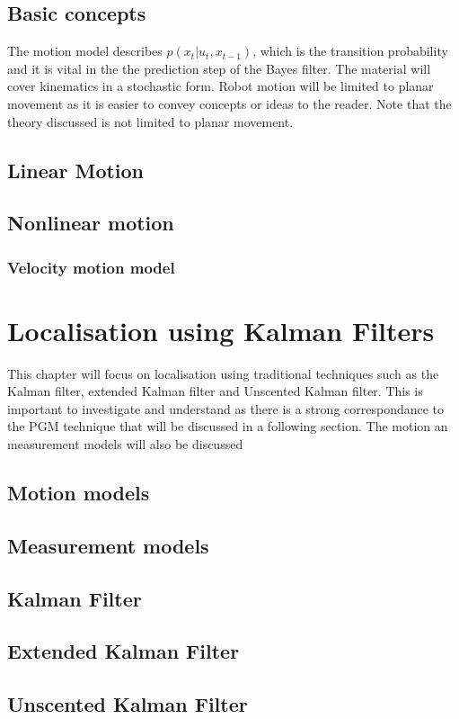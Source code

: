 \documentclass[12pt,oneside,openany,a4paper, %
afrikaans,english,
]{memoir}
\numberwithin{equation}{chapter}
\begin{document}
\section{Basic concepts}
The motion model describes $p(x_t|u_t,x_{t-1})$, which is the transition probability and it is vital in the the prediction step of the Bayes filter. The material will cover kinematics in a stochastic form. Robot motion will be limited to planar movement as it is easier to convey concepts or ideas to the reader. Note that the theory discussed is not limited to planar movement.  
\section{Linear Motion}

\section{Nonlinear motion}
\subsection{Velocity motion model}
\chapter{Localisation using Kalman Filters}
This chapter will focus on localisation using traditional techniques such as the Kalman filter, extended Kalman filter and Unscented Kalman filter. This is important to investigate and understand as there is a strong correspondance to the PGM technique that will be discussed in a following section. The motion an measurement models will also be discussed 
\section{Motion models}
\section{Measurement models}
\section{Kalman Filter}
\section{Extended Kalman Filter}
\section{Unscented Kalman Filter}
\end{document}
